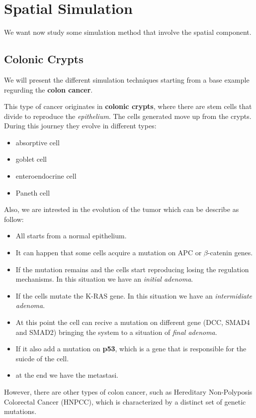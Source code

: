 \chapter{Spatial Simulation}
We want now study some simulation method that involve the spatial 
component. 
\section*{Colonic Crypts}
We will present the different simulation techniques starting from 
a base example regurding the \textbf{colon cancer}.

This type of cancer originates in \textbf{colonic crypts}, where 
there are stem cells that divide to reproduce the \textit{epithelium}.
The cells generated move up from the crypts. During this journey 
they evolve in different types:
\begin{itemize}
    \item absorptive cell
    \item goblet cell
    \item enteroendocrine cell
    \item Paneth cell
\end{itemize}

Also, we are intrested in the evolution of the tumor which can be
describe as follow:
\begin{itemize}
    \item All starts from a normal epithelium.
    \item It can happen that some cells acquire a mutation on APC or 
        $\beta$-catenin genes.
    \item If the mutation remains and the cells start reproducing
        losing the regulation mechanisms. In this situation we have
        an \textit{initial adenoma}.
    \item If the cells mutate the K-RAS gene. In this situation we 
        have an \textit{intermidiate adenoma}.
    \item At this point the cell can recive a mutation on different
        gene (DCC, SMAD4 and SMAD2) bringing the system to a 
        situation of \textit{final adenoma}.
    \item If it also add a mutation on \textbf{p53}, which is a gene 
        that is responsible for the suicde of the cell.
    \item at the end we have the metastasi. 
\end{itemize}
However, there are other types of colon cancer, such as Hereditary Non-Polyposis Colorectal Cancer (HNPCC), which is characterized by a distinct set of genetic mutations.

